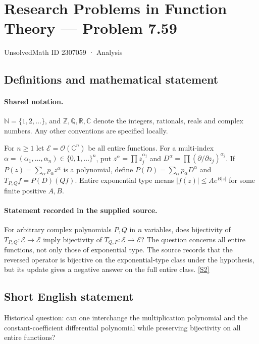 \documentclass[11pt]{article}
\newcommand{\sref}[2]{\hyperlink{source:#1:#2}{[S#2]}}
\begin{document}
\setcounter{section}{2307058}
\section{Research Problems in Function Theory — Problem 7.59}\label{2307059}
{\small\sffamily UnsolvedMath ID 2307059 · Analysis}
\subsection{Definitions and mathematical statement}

\paragraph{Shared notation.}$\mathbb N=\{1,2,\ldots\}$, and $\mathbb Z,\mathbb Q,\mathbb R,\mathbb C$ denote the integers, rationals, reals and complex numbers. Any other conventions are specified locally.


For $n\ge1$ let $\mathcal E=\mathcal O(\mathbb C^n)$ be all entire functions. For a multi-index $\alpha=(\alpha_1,\ldots,\alpha_n)\in\{0,1,\ldots\}^n$, put $z^\alpha=\prod z_j^{\alpha_j}$ and $D^\alpha=\prod(\partial/\partial z_j)^{\alpha_j}$. If $P(z)=\sum_\alpha p_\alpha z^\alpha$ is a polynomial, define $P(D)=\sum_\alpha p_\alpha D^\alpha$ and $T_{P,Q}f=P(D)(Qf)$. Entire exponential type means $|f(z)|\le A e^{B|z|}$ for some finite positive $A,B$.
\paragraph{Statement recorded in the supplied source.}
For arbitrary complex polynomials $P,Q$ in $n$ variables, does bijectivity of $T_{P,Q}:\mathcal E\to\mathcal E$ imply bijectivity of $T_{Q,P}:\mathcal E\to\mathcal E$? The question concerns all entire functions, not only those of exponential type. The source records that the reversed operator is bijective on the exponential-type class under the hypothesis, but its update gives a negative answer on the full entire class. \sref{2307059}{2}
\subsection{Short English statement}
Historical question: can one interchange the multiplication polynomial and the constant-coefficient differential polynomial while preserving bijectivity on all entire functions?
\end{document}
